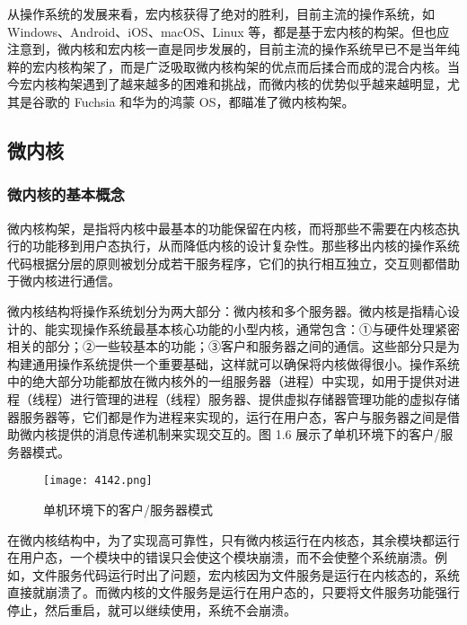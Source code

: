 \documentclass{ctexbook}
\begin{document}
		从操作系统的发展来看，宏内核获得了绝对的胜利，目前主流的操作系统，如 Windows、Android、iOS、macOS、Linux 等，都是基于宏内核的构架。但也应注意到，微内核和宏内核一直是同步发展的，目前主流的操作系统早已不是当年纯粹的宏内核构架了，而是广泛吸取微内核构架的优点而后揉合而成的混合内核。当今宏内核构架遇到了越来越多的困难和挑战，而微内核的优势似乎越来越明显，尤其是谷歌的 Fuchsia 和华为的鸿蒙 OS，都瞄准了微内核构架。
		
		\subsection{微内核}
		\subsubsection{微内核的基本概念}
		微内核构架，是指将内核中最基本的功能保留在内核，而将那些不需要在内核态执行的功能移到用户态执行，从而降低内核的设计复杂性。那些移出内核的操作系统代码根据分层的原则被划分成若干服务程序，它们的执行相互独立，交互则都借助于微内核进行通信。
		
		微内核结构将操作系统划分为两大部分：微内核和多个服务器。微内核是指精心设计的、能实现操作系统最基本核心功能的小型内核，通常包含：①与硬件处理紧密相关的部分；②一些较基本的功能；③客户和服务器之间的通信。这些部分只是为构建通用操作系统提供一个重要基础，这样就可以确保将内核做得很小。操作系统中的绝大部分功能都放在微内核外的一组服务器（进程）中实现，如用于提供对进程（线程）进行管理的进程（线程）服务器、提供虚拟存储器管理功能的虚拟存储器服务器等，它们都是作为进程来实现的，运行在用户态，客户与服务器之间是借助微内核提供的消息传递机制来实现交互的。图 1.6 展示了单机环境下的客户/服务器模式。
		
		\begin{figure}[h]
			\centering
			\centering
			\label{fig:ttt}
			\texttt{[image: 4142.png]}
			\caption{单机环境下的客户/服务器模式}
		\end{figure}
		
		在微内核结构中，为了实现高可靠性，只有微内核运行在内核态，其余模块都运行在用户态，一个模块中的错误只会使这个模块崩溃，而不会使整个系统崩溃。例如，文件服务代码运行时出了问题，宏内核因为文件服务是运行在内核态的，系统直接就崩溃了。而微内核的文件服务是运行在用户态的，只要将文件服务功能强行停止，然后重启，就可以继续使用，系统不会崩溃。
		
\end{document}

